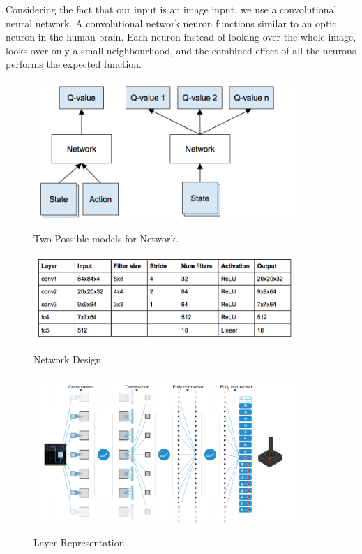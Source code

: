 \documentclass[a4paper,12pt]{report}
\begin{document}
					Considering the fact that our input is an image input, we use a convolutional neural network. A convolutional network neuron functions similar to an optic neuron in the human brain. Each neuron instead of looking over the whole image, looks over only a small neighbourhood, and the combined effect of all the neurons performs the expected function.

					\begin{figure}[!ht]
						\begin{centering}
							\includegraphics[width=10cm]{../Design/images/deep.png}\\
							\caption{Two Possible models for Network\cite{nervana}.}
						\end{centering}
					\end{figure}

					\begin{figure}[!ht]
						\begin{centering}
							\includegraphics[width=10cm]{../Design/images/deep2.png}\\
							\caption{Network Design.}
						\end{centering}
					\end{figure}

					\begin{figure}[!ht]
						\begin{centering}
							\includegraphics[width=10cm]{../Design/images/deep4.png}\\
							\caption{Layer Representation\cite{pong}.}
						\end{centering}
					\end{figure}
\end{document}
